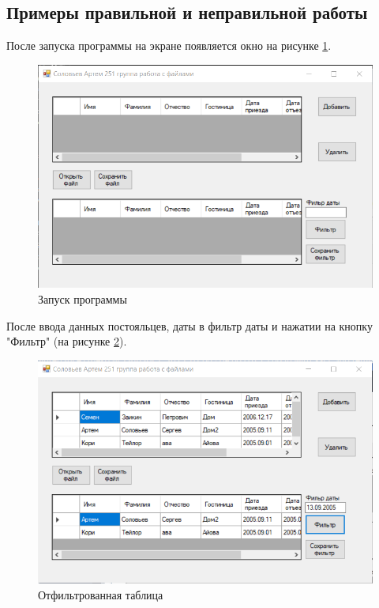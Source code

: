 \subsection{Примеры правильной и неправильной работы}
После запуска программы на экране появляется окно на рисунке \ref{task8_launch1}.
\begin{figure}[H]
    \centering
    \includegraphics[width=0.8\linewidth]{lections/img/task8_launch1.png}
    \caption{Запуск программы}
    \label{task8_launch1}
\end{figure}

После ввода данных постояльцев, даты в фильтр даты и нажатии на кнопку "Фильтр" (на рисунке \ref{task8_launch2}).

\begin{figure}[H]
    \centering
    \includegraphics[width=0.8\linewidth]{lections/img/task8_launch2.png}
    \caption{Отфильтрованная таблица}
    \label{task8_launch2}
\end{figure}

